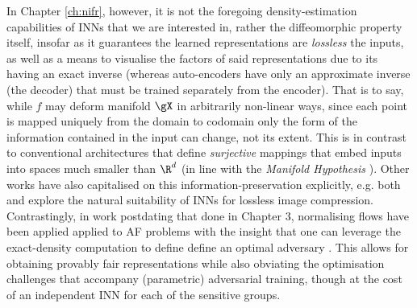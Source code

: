 %
In Chapter \ref{ch:nifr}, however, it is not the foregoing density-estimation capabilities of INNs
that we are interested in, rather the diffeomorphic property itself, insofar as it guarantees the
learned representations are \emph{lossless} \wrt{} the inputs, as well as a means to visualise the
factors of said representations due to its having an exact inverse (whereas auto-encoders have only
an approximate inverse (the decoder) that must be trained separately from the encoder).
%
That is to say, while \(f\) may deform manifold \(\gX\) in arbitrarily non-linear ways, since each
point is mapped uniquely from the domain to codomain only the form of the information contained in
the input can change, not its extent. 
%
This is in contrast to conventional architectures that define \emph{surjective} mappings that embed
inputs into spaces much smaller than \(\R^d\) (in line with the \emph{Manifold Hypothesis}
\citep{fefferman2016testing}).
%
Other works have also capitalised on this information-preservation explicitly, e.g. both
\cite{hoogeboom2019integer} and \cite{xie2021enhanced} explore the natural suitability of INNs for
lossless image compression.
%
Contrastingly, in work postdating that done in Chapter 3, normalising flows have been applied
applied to \ac{AF} problems with the insight that one can leverage the exact-density computation to
define define an optimal adversary \citep{balunovic2021fair, cerrato2022fair}. 
%
This allows for obtaining provably fair representations while also obviating the optimisation
challenges that accompany (parametric) adversarial training, though at the cost of an independent
INN for each of the sensitive groups.

